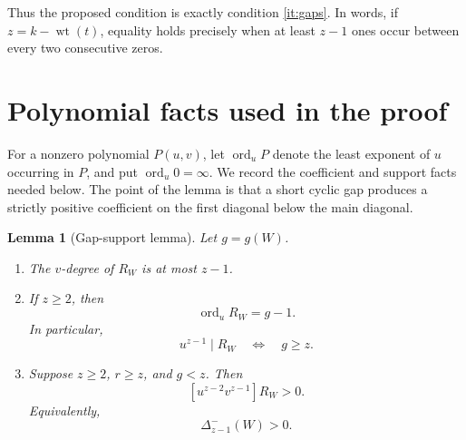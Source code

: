 \documentclass[11pt]{article}
\newtheorem{lemma}[theorem]{Lemma}
\newcommand{\wt}{\operatorname{wt}}
\newcommand{\ord}{\operatorname{ord}}
\begin{document}
Thus the proposed condition is exactly condition
\ref{it:gaps}.  In words, if $z=k-\wt(t)$, equality holds precisely
when at least $z-1$ ones occur between every two consecutive zeros.

\section{Polynomial facts used in the proof}

For a nonzero polynomial $P(u,v)$, let $\ord_uP$ denote the least
exponent of $u$ occurring in $P$, and put $\ord_u0=\infty$.
We record the coefficient and support facts needed below.  The point of
the lemma is that a short cyclic gap produces a strictly positive
coefficient on the first diagonal below the main diagonal.

\begin{lemma}[Gap-support lemma]\label{lem:support}
Let $g=g(W)$.

\begin{enumerate}[label=\textup{(\alph*)}]
\item
The $v$-degree of $R_W$ is at most $z-1$.

\item
If $z\geq2$, then
\[
                         \ord_u R_W=g-1.                     \tag{11}
\]
In particular,
\[
                  u^{z-1}\mid R_W
                  \quad\Longleftrightarrow\quad g\geq z.   \tag{12}
\]

\item
Suppose $z\geq2$, $r\geq z$, and $g<z$.  Then
\[
                    [u^{z-2}v^{z-1}]R_W>0.                  \tag{13}
\]
Equivalently,
\[
                         \Delta_{z-1}^-(W)>0.                \tag{14}
\]
\end{enumerate}
\end{lemma}
\end{document}

